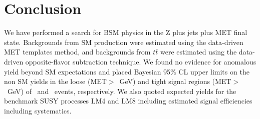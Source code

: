 \section{Conclusion}
\label{sec:conclusion}

We have performed a search for BSM physics in the Z plus jets plus MET final state.
Backgrounds from SM \Z production were estimated using the data-driven
MET templates method, and backgrounds from $t\bar{t}$ were estimated using
the data-driven opposite-flavor subtraction technique. We found no evidence
for anomalous yield beyond SM expectations and placed Bayesian 95\% CL upper limits
on the non SM yields in the loose (MET$>$\signalmetl~GeV) and tight signal regions (MET$>$\signalmett~GeV)
of \ulloose~and \ultight~events, respectively. 
We also quoted expected yields for the 
benchmark SUSY processes LM4 and LM8
including estimated signal efficiencies including systematics.
